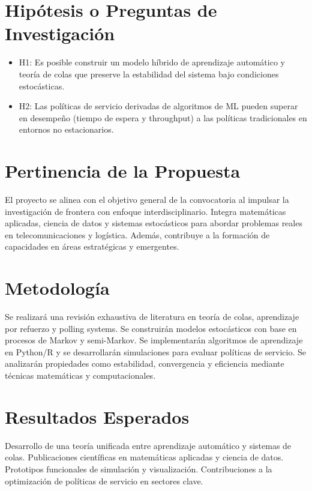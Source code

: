 \documentclass[12pt]{article}
\begin{document}
\section{Hipótesis o Preguntas de Investigación}

\begin{itemize}
  \item H1: Es posible construir un modelo híbrido de aprendizaje automático y teoría de colas que preserve la estabilidad del sistema bajo condiciones estocásticas.
  \item H2: Las políticas de servicio derivadas de algoritmos de ML pueden superar en desempeño (tiempo de espera y throughput) a las políticas tradicionales en entornos no estacionarios.
\end{itemize}

\section{Pertinencia de la Propuesta}
El proyecto se alinea con el objetivo general de la convocatoria al impulsar la investigación de frontera con enfoque interdisciplinario. Integra matemáticas aplicadas, ciencia de datos y sistemas estocásticos para abordar problemas reales en telecomunicaciones y logística. Además, contribuye a la formación de capacidades en áreas estratégicas y emergentes.

\section{Metodología}
Se realizará una revisión exhaustiva de literatura en teoría de colas, aprendizaje por refuerzo y polling systems. Se construirán modelos estocásticos con base en procesos de Markov y semi-Markov. Se implementarán algoritmos de aprendizaje en Python/R y se desarrollarán simulaciones para evaluar políticas de servicio. Se analizarán propiedades como estabilidad, convergencia y eficiencia mediante técnicas matemáticas y computacionales.

\section{Resultados Esperados}
Desarrollo de una teoría unificada entre aprendizaje automático y sistemas de colas. Publicaciones científicas en matemáticas aplicadas y ciencia de datos. Prototipos funcionales de simulación y visualización. Contribuciones a la optimización de políticas de servicio en sectores clave.
\end{document}
